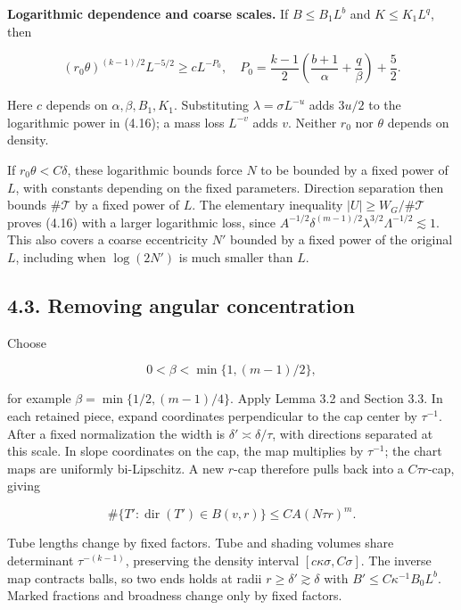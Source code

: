 \documentclass[
  11pt,
  a4paper,
]{article}
\begin{document}
\textbf{Logarithmic dependence and coarse scales.} If \(B\le B_1L^b\)
and \(K\le K_1L^q\), then

\[(r_0\theta)^{(k-1)/2}L^{-5/2}
 \ge c L^{-P_0},
 \quad
 P_0=\frac{k-1}{2}\left(\frac{b+1}{\alpha}+\frac q\beta\right)+\frac52.
\tag{4.17}\label{eq:4.17}\]

Here \(c\) depends on \(\alpha,\beta,B_1,K_1\). Substituting
\(\lambda=\sigma L^{-u}\) adds \(3u/2\) to the logarithmic power in
(4.16); a mass loss \(L^{-v}\) adds \(v\). Neither \(r_0\) nor
\(\theta\) depends on density.

If \(r_0\theta<C\delta\), these logarithmic bounds force \(N\) to be
bounded by a fixed power of \(L\), with constants depending on the fixed
parameters. Direction separation then bounds \(\#\mathcal T\) by a fixed
power of \(L\). The elementary inequality \(|U|\ge W_G/\#\mathcal T\)
proves (4.16) with a larger logarithmic loss, since
\(A^{-1/2}\delta^{(m-1)/2}\lambda^{3/2}\Lambda^{-1/2}\lesssim1\). This
also covers a coarse eccentricity \(N'\) bounded by a fixed power of the
original \(L\), including when \(\log(2N')\) is much smaller than \(L\).

\hypertarget{removing-angular-concentration}{%
\subsection{4.3. Removing angular
concentration}\label{removing-angular-concentration}}

Choose

\[0<\beta<\min\{1,(m-1)/2\},
\tag{4.18}\label{eq:4.18}\]

for example \(\beta=\min\{1/2,(m-1)/4\}\). Apply Lemma 3.2 and Section
3.3. In each retained piece, expand coordinates perpendicular to the cap
center by \(\tau^{-1}\). After a fixed normalization the width is
\(\delta'\asymp\delta/\tau\), with directions separated at this scale.
In slope coordinates on the cap, the map multiplies by \(\tau^{-1}\);
the chart maps are uniformly bi-Lipschitz. A new \(r\)-cap therefore
pulls back into a \(C\tau r\)-cap, giving

\[\#\{T':\operatorname{dir}(T')\in B(v,r)\}
 \le C A(N\tau r)^m.
\tag{4.19}\label{eq:4.19}\]

Tube lengths change by fixed factors. Tube and shading volumes share
determinant \(\tau^{-(k-1)}\), preserving the density interval
\([c\kappa\sigma,C\sigma]\). The inverse map contracts balls, so two
ends holds at radii \(r\ge\delta'\gtrsim\delta\) with
\(B'\le C\kappa^{-1}B_0L^b\). Marked fractions and broadness change only
by fixed factors.
\end{document}
